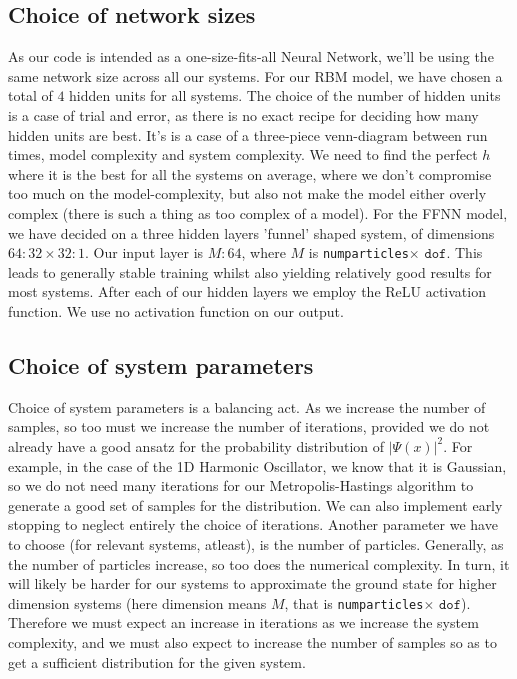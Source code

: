 \documentclass[12pt]{article}
\begin{document}
{\subsection{Choice of network sizes}
As our code is intended as a one-size-fits-all Neural Network, we'll be using the same network size across all our systems. For our RBM model, we have chosen a total of $4$ hidden units for all systems. The choice of the number of hidden units is a case of trial and error, as there is no exact recipe for deciding how many hidden units are best. It's is a case of a three-piece venn-diagram between run times, model complexity and system complexity. We need to find the perfect $h$ where it is the best for all the systems on average, where we don't compromise too much on the model-complexity, but also not make the model either overly complex (there is such a thing as too complex of a model).\newline
For the FFNN model, we have decided on a three hidden layers 'funnel' shaped system, of dimensions $64:32\times32:1$. Our input layer is $M:64$, where $M$ is \texttt{num\textunderscore particles}$\times$ $\texttt{dof}$. This leads to generally stable training whilst also yielding relatively good results for most systems. After each of our hidden layers we employ the ReLU activation function. We use no activation function on our output.
\subsection{Choice of system parameters}
Choice of system parameters is a balancing act. As we increase the number of samples, so too must we increase the number of iterations, provided we do not already have a good ansatz for the probability distribution of $|\Psi(x)|^2$. For example, in the case of the 1D Harmonic Oscillator, we know that it is Gaussian, so we do not need many iterations for our Metropolis-Hastings algorithm to generate a good set of samples for the distribution. We can also implement early stopping to neglect entirely the choice of iterations. \newline
Another parameter we have to choose (for relevant systems, atleast), is the number of particles. Generally, as the number of particles increase, so too does the numerical complexity. In turn, it will likely be harder for our systems to approximate the ground state for higher dimension systems (here dimension means $M$, that is \texttt{num\textunderscore particles}$\times$ $\texttt{dof}$). Therefore we must expect an increase in iterations as we increase the system complexity, and we must also expect to increase the number of samples so as to get a sufficient distribution for the given system.
\newpage
}
\end{document}
